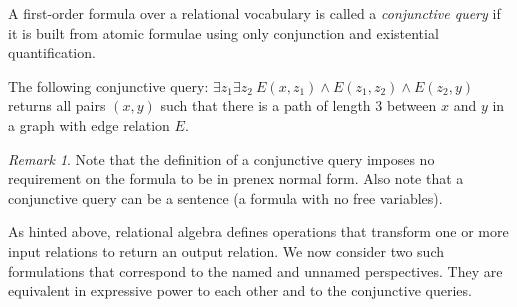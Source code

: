 \documentclass[oneside, 11pt]{amsbook}
\theoremstyle{plain}
\theoremstyle{definition}
\theoremstyle{remark}
\newtheorem*{remark}{Remark}
\begin{document}
\begin{defn}
    A first-order formula over a relational vocabulary is called a \emph{conjunctive query} if it is built from atomic formulae using only conjunction and existential quantification.
\end{defn}

\begin{exmpl}
    The following conjunctive query: $\exists z_1 \exists z_2 \ E(x, z_1) \land E(z_1, z_2) \land E(z_2, y)$ returns all pairs $(x,y)$ such that there is a path of length $3$ between $x$ and $y$ in a graph with edge relation $E$.
\end{exmpl}

\begin{remark}
    Note that the definition of a conjunctive query imposes no requirement on the formula to be in prenex normal form. Also note that a conjunctive query can be a sentence (a formula with no free variables).
\end{remark}

As hinted above, relational algebra defines operations that transform one or more input relations to return an output relation. We now consider two such formulations that correspond to the named and unnamed perspectives. They are equivalent in expressive power to each other and to the conjunctive queries.
\end{document}
